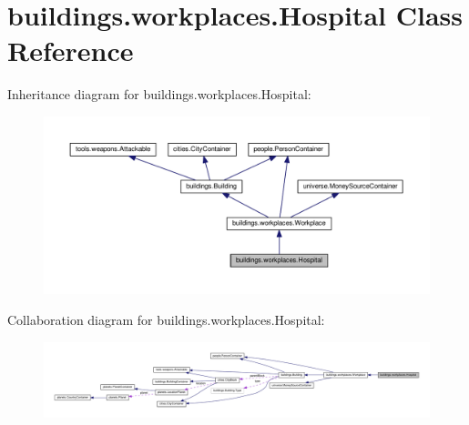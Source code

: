 \hypertarget{classbuildings_1_1workplaces_1_1_hospital}{}\section{buildings.\+workplaces.\+Hospital Class Reference}
\label{classbuildings_1_1workplaces_1_1_hospital}


Inheritance diagram for buildings.\+workplaces.\+Hospital\+:\nopagebreak
\begin{figure}[H]
\begin{center}
\leavevmode
\includegraphics[width=350pt]{classbuildings_1_1workplaces_1_1_hospital__inherit__graph}
\end{center}
\end{figure}


Collaboration diagram for buildings.\+workplaces.\+Hospital\+:\nopagebreak
\begin{figure}[H]
\begin{center}
\leavevmode
\includegraphics[width=350pt]{classbuildings_1_1workplaces_1_1_hospital__coll__graph}
\end{center}
\end{figure}
